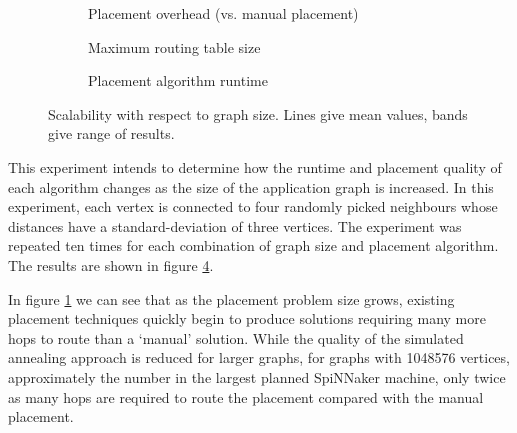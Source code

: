 				\begin{figure}
					\center
					\begin{subfigure}{\linewidth}
						\center
						
						\caption{Placement overhead (vs. manual placement)}
						\label{fig:placement-scalability-size-quality}
					\end{subfigure}
					
					\vspace*{1em}
					
					\begin{subfigure}{\linewidth}
						\center
						
						\caption{Maximum routing table size}
						\label{fig:placement-scalability-size-entries}
					\end{subfigure}
					
					\vspace*{1em}
					
					\begin{subfigure}{\linewidth}
						\center
						
						\caption{Placement algorithm runtime}
						\label{fig:placement-scalability-size-runtime}
					\end{subfigure}
					
					\caption{Scalability with respect to graph size. Lines give mean
					values, bands give range of results.}
					\label{fig:placement-scalability-size}
				\end{figure}
				
				This experiment intends to determine how the runtime and placement
				quality of each algorithm changes as the size of the application graph
				is increased. In this experiment, each vertex is connected to four
				randomly picked neighbours whose distances have a standard-deviation of
				three vertices.  The experiment was repeated ten times for each
				combination of graph size and placement algorithm. The results are
				shown in figure \ref{fig:placement-scalability-size}.
				
				In figure \ref{fig:placement-scalability-size-quality} we can see that
				as the placement problem size grows, existing placement techniques
				quickly begin to produce solutions requiring many more hops to route
				than a `manual' solution. While the quality of the simulated annealing
				approach is reduced for larger graphs, for graphs with \num{1048576}
				vertices, approximately the number in the largest planned SpiNNaker
				machine, only twice as many hops are required to route the placement
				compared with the manual placement.
				

